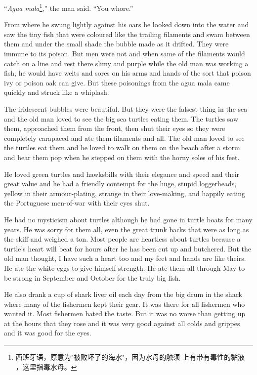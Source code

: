 \documentclass[fontset=ubuntu,zihao=-4]{ctexrep}
\begin{document}
``\emph{Agua mala}\footnote{西班牙语，原意为"被败坏了的海水"，因为水母的触须
  上有带有毒性的黏液 ，这里指毒水母。},'' the man said. ``You \gls{whore}.''

From where he \gls{swung} lightly against his oars he looked down into the
water and saw the tiny fish that were coloured like the trailing filaments
and swam between them and under the small shade the bubble made as it
drifted. They were \gls{immune} to its \gls{poison}. But men were not and
when same of the filaments would catch on a line and rest there \gls{slimy}
and purple while the old man was working a fish, he would have \glspl{welt}
and \glspl{sore} on his arms and hands of the sort that poison ivy or poison
oak can give. But these \glspl{poisoning} from the agua mala came quickly and
\gls{struck} like a \gls{whiplash}.

The iridescent bubbles were beautiful. But they were the \gls{falsest} thing
in the sea and the old man loved to see the big sea turtles eating
them. The turtles saw them, \gls{approached} them from the front, then shut
their eyes so they were completely \gls{carapaced} and ate them filaments
and all. The old man loved to see the turtles eat them and he loved to walk
on them on the beach after a storm and hear them pop when he stepped on them
with the \gls{horny} \glspl{sole} of his feet.

He loved green turtles and \glspl{hawksbill} with their \gls{elegance} and
speed and their great value and he had a friendly \gls{contempt} for the
huge, stupid \glspl{loggerhead}, yellow in their armour-plating, strange in their
love-making, and happily eating the Portuguese men-of-war with their eyes
shut.

He had no \gls{mysticism} about turtles although he had gone in turtle boats
for many years. He was sorry for them all, even the great trunk \gls{backs}
that were as long as the skiff and \gls{weighed} a ton. Most people are
\gls{heartless} about turtles because a turtle's heart will beat for hours
after he has been cut up and butchered. But the old man thought, I have such
a heart too and my feet and hands are like theirs. He ate the white eggs to
give himself strength. He ate them all through May to be strong in September
and October for the truly big fish.

He also drank a cup of shark liver oil each day from the big \gls{drum} in the
shack where many of the fishermen kept their gear. It was there for all
fishermen who wanted it. Most fishermen hated the taste. But it was no worse
than getting up at the hours that they rose and it was very good against all
colds and \gls{grippes} and it was good for the eyes.
\end{document}
